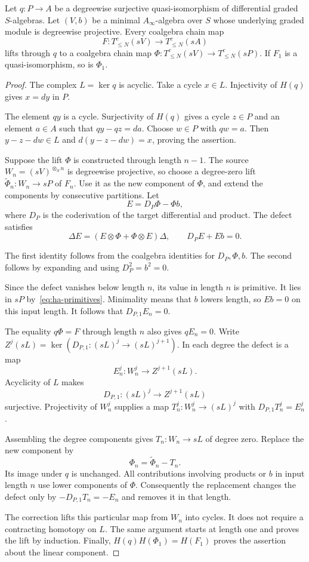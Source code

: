 \begin{lemma}\label{lem:ha-surjective-lifting}
Let $q:P\to A$ be a degreewise surjective quasi-isomorphism of
differential graded $S$-algebras.
Let $(V,b)$ be a minimal $A_\infty$-algebra over $S$ whose
underlying graded module is degreewise projective.
Every coalgebra chain map
\[
 F:T^c_{\leq N}(sV)\longrightarrow T^c_{\leq N}(sA)
\]
lifts through $q$ to a coalgebra chain map
$\Phi:T^c_{\leq N}(sV)\to T^c_{\leq N}(sP)$.
If $F_1$ is a quasi-isomorphism, so is $\Phi_1$.
\end{lemma}

\begin{proof}
The complex $L=\ker q$ is acyclic. Take a cycle
$x\in L$. Injectivity of $H(q)$ gives $x=dy$ in $P$.

The element $qy$ is a cycle. Surjectivity of $H(q)$ gives a cycle
$z\in P$ and an element $a\in A$ such that $qy-qz=da$.
Choose $w\in P$ with $qw=a$. Then $y-z-dw\in L$ and
$d(y-z-dw)=x$, proving the assertion.

Suppose the lift $\Phi$ is constructed through length $n-1$.
The source $W_n=(sV)^{\otimes_S n}$ is degreewise projective,
so choose a degree-zero lift $\widetilde\Phi_n:W_n\to sP$ of $F_n$.
Use it as the new component of $\Phi$, and extend the components
by consecutive partitions. Let
\[
 E=D_P\Phi-\Phi b,
\]
where $D_P$ is the coderivation of the target differential and product.
The defect satisfies
\[
 \Delta E=(E\otimes\Phi+\Phi\otimes E)\Delta,
 \qquad D_PE+Eb=0.
\]

The first identity follows from the coalgebra identities for
$D_P,\Phi,b$. The second follows by expanding and using
$D_P^2=b^2=0$.

Since the defect vanishes below length $n$, its value in length $n$
is primitive. It lies in $sP$ by~\eqref{eq:ha-primitives}.
Minimality means that
$b$ lowers length, so $Eb=0$ on this input length.
It follows that $D_{P,1}E_n=0$.

The equality $q\Phi=F$ through length $n$ also gives $qE_n=0$.
Write $Z^j(sL)=\ker(D_{P,1}:(sL)^j\to(sL)^{j+1})$.
In each degree the defect is a map
\[
 E_n^j:W_n^j\longrightarrow Z^{j+1}(sL).
\]
Acyclicity of $L$ makes
\[
 D_{P,1}:(sL)^j\longrightarrow Z^{j+1}(sL)
\]
surjective.
Projectivity of $W_n^j$ supplies a map $T_n^j:W_n^j\to(sL)^j$
with $D_{P,1}T_n^j=E_n^j$.

Assembling the degree components gives $T_n:W_n\to sL$ of degree zero.
Replace the new component by
\[
 \Phi_n=\widetilde\Phi_n-T_n.
\]
Its image under $q$ is unchanged.
All contributions involving products or $b$ in input length $n$
use lower components of $\Phi$.
Consequently the replacement changes the defect only by
$-D_{P,1}T_n=-E_n$ and removes it in that length.

The correction lifts this particular map from $W_n$ into cycles.
It does not require a contracting homotopy on $L$.
The same argument starts at length one and proves the lift by induction.
Finally, $H(q)H(\Phi_1)=H(F_1)$ proves the assertion about the
linear component.
\end{proof}

